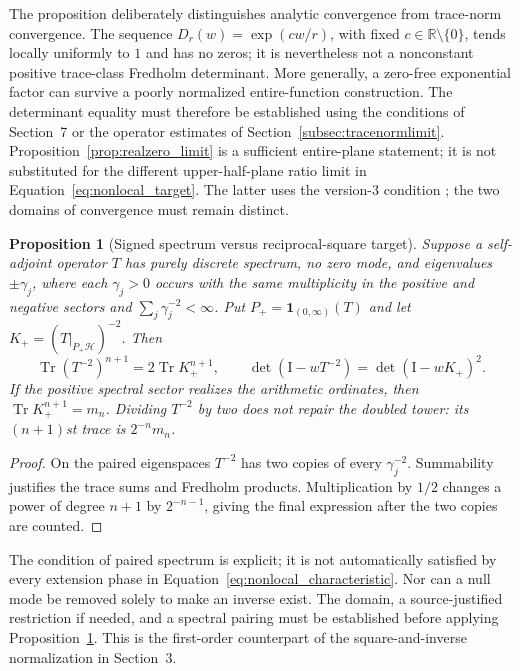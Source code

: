\documentclass[11pt,letterpaper]{article}
\numberwithin{equation}{section}
\newtheorem{proposition}[theorem]{Proposition}
\theoremstyle{definition}
\theoremstyle{remark}
\newcommand{\R}{\mathbb R}
\newcommand{\HS}{\mathcal H}
\newcommand{\Id}{\mathrm I}
\DeclareMathOperator{\Tr}{Tr}
\begin{document}
The proposition deliberately distinguishes analytic convergence from trace-norm convergence. The sequence $D_r(w)=\exp(cw/r)$, with fixed $c\in\R\setminus\{0\}$, tends locally uniformly to $1$ and has no zeros; it is nevertheless not a nonconstant positive trace-class Fredholm determinant. More generally, a zero-free exponential factor can survive a poorly normalized entire-function construction. The determinant equality must therefore be established using the conditions of Section~7 or the operator estimates of Section~\ref{subsec:tracenormlimit}. Proposition~\ref{prop:realzero_limit} is a sufficient entire-plane statement; it is not substituted for the different upper-half-plane ratio limit in Equation~\eqref{eq:nonlocal_target}. The latter uses the version-3 condition \cite[Corollary~1.6, Equation~(1.12)]{suzuki2026}; the two domains of convergence must remain distinct.

\begin{proposition}[Signed spectrum versus reciprocal-square target]
\label{prop:signed_spectrum}
Suppose a self-adjoint operator $T$ has purely discrete spectrum, no zero mode, and eigenvalues $\pm\gamma_j$, where each $\gamma_j>0$ occurs with the same multiplicity in the positive and negative sectors and $\sum_j\gamma_j^{-2}<\infty$. Put $P_+=\mathbf1_{(0,\infty)}(T)$ and let $K_+=(T|_{P_+\HS})^{-2}$. Then
\begin{equation}
 \Tr(T^{-2})^{n+1}=2\Tr K_+^{n+1},
 \qquad
 \det(\Id-wT^{-2})=\det(\Id-wK_+)^2.
 \label{eq:signed_square_count}
\end{equation}
If the positive spectral sector realizes the arithmetic ordinates, then $\Tr K_+^{n+1}=m_n$. Dividing $T^{-2}$ by two does not repair the doubled tower: its $(n+1)$st trace is $2^{-n}m_n$.
\end{proposition}
\begin{proof}
On the paired eigenspaces $T^{-2}$ has two copies of every $\gamma_j^{-2}$. Summability justifies the trace sums and Fredholm products. Multiplication by $1/2$ changes a power of degree $n+1$ by $2^{-n-1}$, giving the final expression after the two copies are counted.
\end{proof}

The condition of paired spectrum is explicit; it is not automatically satisfied by every extension phase in Equation~\eqref{eq:nonlocal_characteristic}. Nor can a null mode be removed solely to make an inverse exist. The domain, a source-justified restriction if needed, and a spectral pairing must be established before applying Proposition~\ref{prop:signed_spectrum}. This is the first-order counterpart of the square-and-inverse normalization in Section~3.
\end{document}
